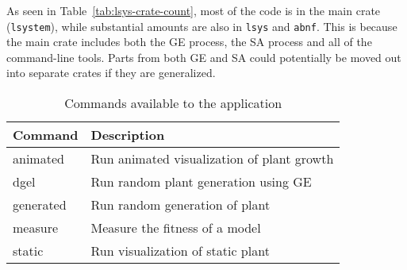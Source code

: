 As seen in Table~\ref{tab:lsys-crate-count}, most of the code is in the main crate (\texttt{lsystem}),  while substantial amounts are also in \texttt{lsys} and \texttt{abnf}.
This is because the main crate includes both the \gls{GE} process, the \gls{SA} process and all of the command-line tools.
Parts from both \gls{GE} and \gls{SA} could potentially be moved out into separate crates if they are generalized.

\begin{table}
    \centering
    \begin{tabular}{| l | l |}
    \hline
    Command & Description \\
    \hline
    animated    & Run animated visualization of plant growth \\
    dgel        & Run random plant generation using GE \\
    generated   & Run random generation of plant \\
    measure     & Measure the fitness of a model \\
    static      & Run visualization of static plant \\
    \hline
    \end{tabular}
    \caption{Commands available to the application}
    \label{tab:lsys-cli}
\end{table}

